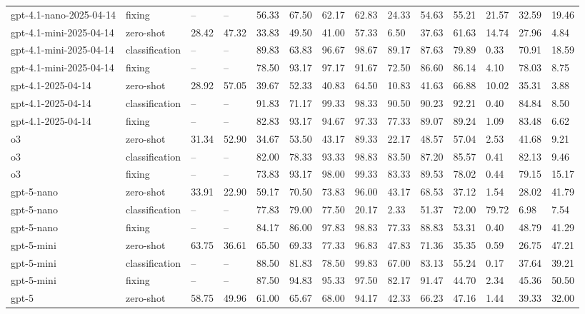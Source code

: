 \begin{table}[!t]
\begin{tabular}{llllllllllllll}
gpt-4.1-nano-2025-04-14 & fixing & -- & -- & 56.33 & 67.50 & 62.17 & 62.83 & 24.33 & 54.63 & 55.21 & 21.57 & 32.59 & 19.46 \\
gpt-4.1-mini-2025-04-14 & zero-shot & 28.42 & 47.32 & 33.83 & 49.50 & 41.00 & 57.33 & 6.50 & 37.63 & 61.63 & 14.74 & 27.96 & 4.84 \\
gpt-4.1-mini-2025-04-14 & classification & -- & -- & 89.83 & 63.83 & 96.67 & 98.67 & 89.17 & 87.63 & 79.89 & 0.33 & 70.91 & 18.59 \\
gpt-4.1-mini-2025-04-14 & fixing & -- & -- & 78.50 & 93.17 & 97.17 & 91.67 & 72.50 & 86.60 & 86.14 & 4.10 & 78.03 & 8.75 \\
gpt-4.1-2025-04-14 & zero-shot & 28.92 & 57.05 & 39.67 & 52.33 & 40.83 & 64.50 & 10.83 & 41.63 & 66.88 & 10.02 & 35.31 & 3.88 \\
gpt-4.1-2025-04-14 & classification & -- & -- & 91.83 & 71.17 & 99.33 & 98.33 & 90.50 & 90.23 & 92.21 & 0.40 & 84.84 & 8.50 \\
gpt-4.1-2025-04-14 & fixing & -- & -- & 82.83 & 93.17 & 94.67 & 97.33 & 77.33 & 89.07 & 89.24 & 1.09 & 83.48 & 6.62 \\
o3 & zero-shot & 31.34 & 52.90 & 34.67 & 53.50 & 43.17 & 89.33 & 22.17 & 48.57 & 57.04 & 2.53 & 41.68 & 9.21 \\
o3 & classification & -- & -- & 82.00 & 78.33 & 93.33 & 98.83 & 83.50 & 87.20 & 85.57 & 0.41 & 82.13 & 9.46 \\
o3 & fixing & -- & -- & 73.83 & 93.17 & 98.00 & 99.33 & 83.33 & 89.53 & 78.02 & 0.44 & 79.15 & 15.17 \\
gpt-5-nano & zero-shot & 33.91 & 22.90 & 59.17 & 70.50 & 73.83 & 96.00 & 43.17 & 68.53 & 37.12 & 1.54 & 28.02 & 41.79 \\
gpt-5-nano & classification & -- & -- & 77.83 & 79.00 & 77.50 & 20.17 & 2.33 & 51.37 & 72.00 & 79.72 & 6.98 & 7.54 \\
gpt-5-nano & fixing & -- & -- & 84.17 & 86.00 & 97.83 & 98.83 & 77.33 & 88.83 & 53.31 & 0.40 & 48.79 & 41.29 \\
gpt-5-mini & zero-shot & 63.75 & 36.61 & 65.50 & 69.33 & 77.33 & 96.83 & 47.83 & 71.36 & 35.35 & 0.59 & 26.75 & 47.21 \\
gpt-5-mini & classification & -- & -- & 88.50 & 81.83 & 78.50 & 99.83 & 67.00 & 83.13 & 55.24 & 0.17 & 37.64 & 39.21 \\
gpt-5-mini & fixing & -- & -- & 87.50 & 94.83 & 95.33 & 97.50 & 82.17 & 91.47 & 44.70 & 2.34 & 45.36 & 50.50 \\
gpt-5 & zero-shot & 58.75 & 49.96 & 61.00 & 65.67 & 68.00 & 94.17 & 42.33 & 66.23 & 47.16 & 1.44 & 39.33 & 32.00 \\

\end{tabular}
\end{table}
